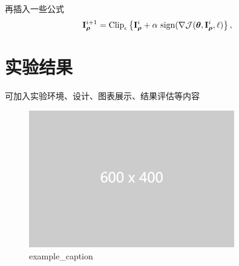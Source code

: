 \documentclass[zihao=-4]{ctexart}
\begin{document}
\begin{spacing}{1.5}
再插入一些公式
\begin{align}
{\bf I}_{\boldsymbol\rho}^{i + 1} = \text{Clip}_{\epsilon} \left \{ {\bf I}_{\boldsymbol\rho}^i + \alpha~\text{sign} (\nabla \mathcal J(\boldsymbol\theta, {\bf I}_{\boldsymbol\rho}^i, \ell) \right \},
\label{eq:BIM}
\end{align}

\section{实验结果}
可加入实验环境、设计、图表展示、结果评估等内容

\begin{figure}[H] %
    \centering %
    \includegraphics[width=0.8\textwidth]{example-image-2.png} %
    \caption{example\_caption} %
    \label{example_label} %
\end{figure}


\end{spacing}
\end{document}
